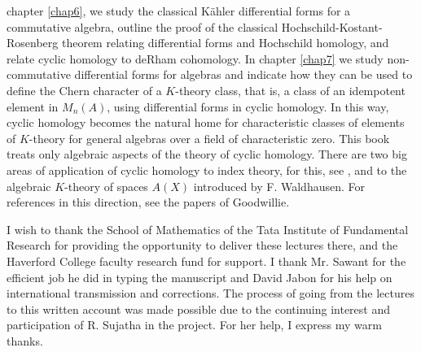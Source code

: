 chapter \ref{chap6}, we study the classical K\"ahler differential
forms for a commutative algebra, outline the proof of the classical
Hochschild-Kostant-Rosenberg theorem relating differential forms and
Hochschild homology, and relate cyclic homology to deRham
cohomology. In chapter \ref{chap7} we study non-commutative
differential forms for algebras and indicate how they can be used to
define the Chern character of a $K$-theory class, that is, a class of
an idempotent element in $M_{n}(A)$, using differential forms in
cyclic homology. In this way, cyclic homology becomes the natural home
for characteristic classes of elements of $K$-theory for general
algebras over a field of characteristic zero. This book treats only
algebraic aspects of the theory of cyclic homology. There are two big
areas of application of cyclic homology to index theory, for this, see
\cite{Connes1990}, and to the algebraic $K$-theory of spaces $A(X)$
introduced by F. Waldhausen. For references in this direction, see the
papers of Goodwillie.

I wish to thank the School of Mathematics of the Tata Institute of
Fundamental Research for providing the opportunity to deliver these
lectures there, and the Haverford College faculty research fund for
support. I thank Mr. Sawant for the efficient job he did in typing the
manuscript and David Jabon for his help on international transmission
and corrections. The process of going from the lectures to this
written account was made possible due to the continuing interest and
participation of R. Sujatha in the project. For her help, I express my
warm thanks. 
